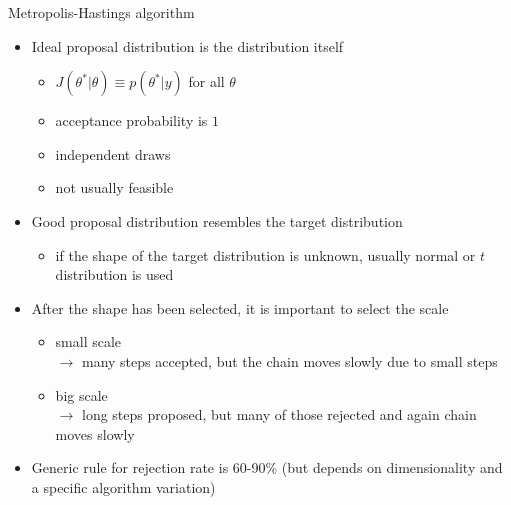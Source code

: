 \documentclass[finnish,english,t]{beamer}
\begin{document}
\begin{frame}{Metropolis-Hastings algorithm}

  \begin{itemize}
  \item Ideal proposal distribution is the distribution itself
    \begin{itemize}
    \item $J(\theta^{*}|\theta)\equiv p(\theta^{*}|y)$ for all
      $\theta$
    \item acceptance probability is $1$
    \item independent draws
    \item not usually feasible
    \end{itemize}
  \item<2-> Good proposal distribution resembles the target distribution
    \begin{itemize}
    \item if the shape of the target distribution is unknown, usually
      normal or $t$ distribution is used
    \end{itemize}
  \item<3-> After the shape has been selected, it is important to select the scale
    \begin{itemize}
    \item small scale \\$\rightarrow$ many steps accepted, but the chain moves slowly due to small steps
    \item big scale \\$\rightarrow$ long steps proposed, but many of
      those rejected and again chain moves slowly
    \end{itemize}
  \item<4-> Generic rule for rejection rate is 60-90\% (but depends on
    dimensionality and a specific algorithm variation)
\end{itemize}

\end{frame}



\end{document}
